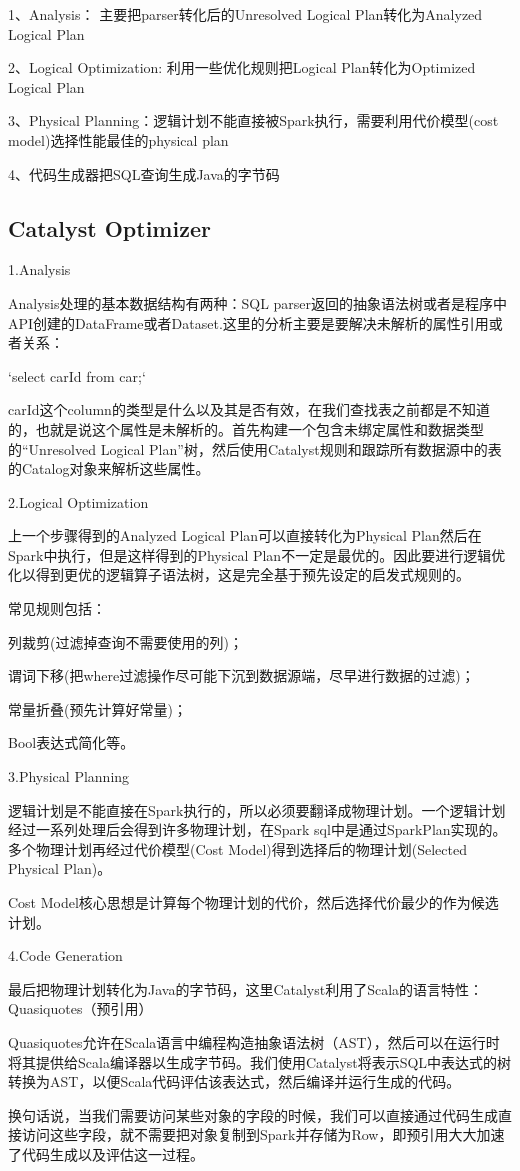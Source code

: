 \documentclass[CJK]{ctexart}
\begin{document}
\begin{multicols}{2}
1、Analysis： 主要把parser转化后的Unresolved Logical Plan转化为Analyzed Logical Plan

2、Logical Optimization: 利用一些优化规则把Logical Plan转化为Optimized Logical Plan

3、Physical Planning：逻辑计划不能直接被Spark执行，需要利用代价模型(cost model)选择性能最佳的physical plan

4、代码生成器把SQL查询生成Java的字节码

\subsection{Catalyst Optimizer}
1.Analysis

Analysis处理的基本数据结构有两种：SQL parser返回的抽象语法树或者是程序中API创建的DataFrame或者Dataset.这里的分析主要是要解决未解析的属性引用或者关系：

`select carId from car;`

carId这个column的类型是什么以及其是否有效，在我们查找表之前都是不知道的，也就是说这个属性是未解析的。首先构建一个包含未绑定属性和数据类型的“Unresolved Logical Plan”树，然后使用Catalyst规则和跟踪所有数据源中的表的Catalog对象来解析这些属性。

2.Logical Optimization

上一个步骤得到的Analyzed Logical Plan可以直接转化为Physical Plan然后在Spark中执行，但是这样得到的Physical Plan不一定是最优的。因此要进行逻辑优化以得到更优的逻辑算子语法树，这是完全基于预先设定的启发式规则的。

常见规则包括：

列裁剪(过滤掉查询不需要使用的列)；

谓词下移(把where过滤操作尽可能下沉到数据源端，尽早进行数据的过滤)；

常量折叠(预先计算好常量)；

Bool表达式简化等。

3.Physical Planning

逻辑计划是不能直接在Spark执行的，所以必须要翻译成物理计划。一个逻辑计划经过一系列处理后会得到许多物理计划，在Spark sql中是通过SparkPlan实现的。多个物理计划再经过代价模型(Cost Model)得到选择后的物理计划(Selected Physical Plan)。

Cost Model核心思想是计算每个物理计划的代价，然后选择代价最少的作为候选计划。

4.Code Generation

最后把物理计划转化为Java的字节码，这里Catalyst利用了Scala的语言特性：Quasiquotes（预引用）

Quasiquotes允许在Scala语言中编程构造抽象语法树（AST），然后可以在运行时将其提供给Scala编译器以生成字节码。我们使用Catalyst将表示SQL中表达式的树转换为AST，以便Scala代码评估该表达式，然后编译并运行生成的代码。

换句话说，当我们需要访问某些对象的字段的时候，我们可以直接通过代码生成直接访问这些字段，就不需要把对象复制到Spark并存储为Row，即预引用大大加速了代码生成以及评估这一过程。
\end{multicols}
\end{document}
